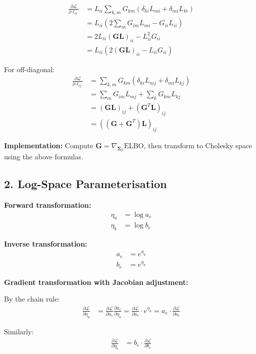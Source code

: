 \documentclass[11pt]{article}
\newcommand{\ELBO}{\text{ELBO}}
\begin{document}
\begin{align}
\frac{\partial \mathcal{L}}{\partial \ell_{ii}} &= L_{ii} \sum_{k,m} G_{km} (\delta_{ki} L_{m i} + \delta_{mi} L_{ki})\\
&= L_{ii} \left(2 \sum_{m} G_{im} L_{mi} - G_{ii} L_{ii}\right)\\
&= 2 L_{ii} \left(\bm{G} \bm{L}\right)_{ii} - L_{ii}^2 G_{ii}\\
&= L_{ii} \left(2 (\bm{G} \bm{L})_{ii} - L_{ii} G_{ii}\right)
\end{align}

For off-diagonal:
\begin{align}
\frac{\partial \mathcal{L}}{\partial \ell_{ij}} &= \sum_{k,m} G_{km} (\delta_{ki} L_{mj} + \delta_{mi} L_{kj})\\
&= \sum_m G_{im} L_{mj} + \sum_k G_{km} L_{kj}\\
&= (\bm{G} \bm{L})_{ij} + (\bm{G}^T \bm{L})_{ij}\\
&= ((\bm{G} + \bm{G}^T) \bm{L})_{ij}
\end{align}

\textbf{Implementation:} Compute $\bm{G} = \nabla_{\bm{\Sigma}_\beta} \ELBO$, then transform to Cholesky space using the above formulas.

\subsection*{2. Log-Space Parameterisation}

\textbf{Forward transformation:}
\begin{align}
\eta_a &= \log a_e\\
\eta_b &= \log b_e
\end{align}

\textbf{Inverse transformation:}
\begin{align}
a_e &= e^{\eta_a}\\
b_e &= e^{\eta_b}
\end{align}

\textbf{Gradient transformation with Jacobian adjustment:}

By the chain rule:
\begin{align}
\frac{\partial \mathcal{L}}{\partial \eta_a} &= \frac{\partial \mathcal{L}}{\partial a_e} \frac{\partial a_e}{\partial \eta_a} = \frac{\partial \mathcal{L}}{\partial a_e} \cdot e^{\eta_a} = a_e \cdot \frac{\partial \mathcal{L}}{\partial a_e}
\end{align}

Similarly:
\begin{align}
\frac{\partial \mathcal{L}}{\partial \eta_b} &= b_e \cdot \frac{\partial \mathcal{L}}{\partial b_e}
\end{align}
\end{document}
